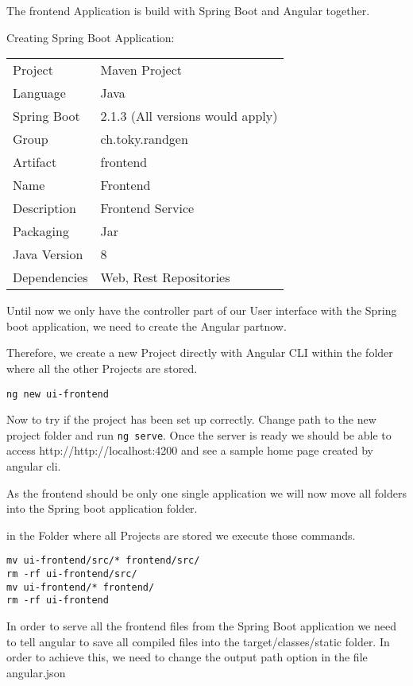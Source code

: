 The frontend Application is build with Spring Boot and Angular together.

Creating Spring Boot Application:
\begin{tabbing}
\begin{tabular}{ll}
Project & Maven Project \\
Language & Java \\
Spring Boot & 2.1.3 (All versions would apply) \\
Group & ch.toky.randgen \\
Artifact & frontend \\
Name & Frontend \\
Description & Frontend Service \\
Packaging & Jar \\
Java Version & 8 \\
Dependencies & Web, Rest Repositories
\end{tabular}
\end{tabbing}

Until now we only have the controller part of our User interface with the Spring boot application, we need to create the Angular partnow.

Therefore, we create a new Project directly with Angular CLI within the folder where all the other Projects are stored.

\begin{verbatim}
ng new ui-frontend
\end{verbatim}

Now to try if the project has been set up correctly. Change path to the new project folder and run \texttt{ng serve}.
Once the server is ready we should be able to access http://http://localhost:4200 and see a sample home page created by angular cli.

As the frontend should be only one single application we will now move all folders into the Spring boot application folder.

in the Folder where all Projects are stored we execute those commands.
\begin{verbatim}
mv ui-frontend/src/* frontend/src/
rm -rf ui-frontend/src/
mv ui-frontend/* frontend/
rm -rf ui-frontend
\end{verbatim}

In order to serve all the frontend files from the Spring Boot application we need to tell angular to save all compiled files into the target/classes/static folder.
In order to achieve this, we need to change the output path option in the file angular.json


